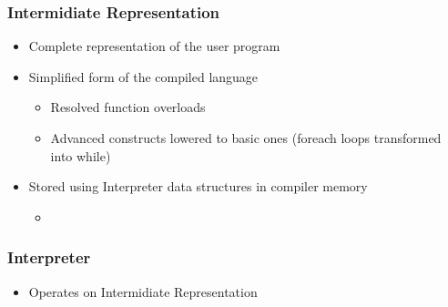 \begin{frame}
    \frametitle{Intermidiate Representation}

    \begin{itemize}
        \item Complete representation of the user program
        \item Simplified form of the compiled language\begin{itemize}
            \item Resolved function overloads
            \item Advanced constructs lowered to basic ones (foreach loops transformed into while)
        \end{itemize}
        \item Stored using Interpreter data structures in compiler memory\begin{itemize}
            \item 
        \end{itemize}
    \end{itemize}

\end{frame}

\begin{frame}
    \frametitle{Interpreter}

    \begin{itemize}
        \item Operates on Intermidiate Representation
    \end{itemize}

\end{frame}
